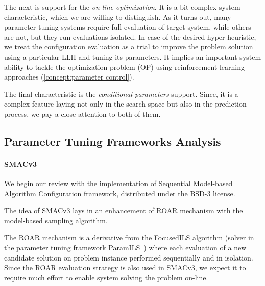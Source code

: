 The next is support for the \emph{on-line optimization}. It is a bit complex system characteristic, which we are willing to distinguish. As it turns out, many parameter tuning systems require full evaluation of target system,  while others are not, but they run evaluations isolated. In case of the desired hyper-heuristic, we treat the configuration evaluation as a trial to improve the problem solution using a particular LLH and tuning its parameters. It implies an important system ability to tackle the optimization problem (OP) using reinforcement learning approaches (\cref{concept:parameter control}).

The final characteristic is the \emph{conditional parameters} support. Since, it is a complex feature laying not only in the search space but also in the prediction process, we pay a close attention to both of them.

\subsection{Parameter Tuning Frameworks Analysis}\label{impl: Parameter Tuning Frameworks Analysis}
\paragraph{SMACv3}
We begin our review with the implementation of Sequential Model-based Algorithm Configuration framework, distributed under the BSD-3 license.

The idea of SMACv3 lays in an enhancement of ROAR mechanism with the model-based sampling algorithm.

The ROAR mechanism is a derivative from the FocusedILS algorithm (solver in the parameter tuning framework ParamILS~\cite{hutter2009paramils}) where each evaluation of a new candidate solution on problem instance performed sequentially and in isolation. Since the ROAR evaluation strategy is also used in SMACv3, we expect it to require much effort to enable system solving the problem on-line.

